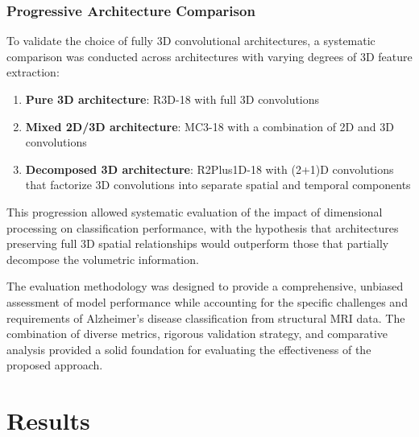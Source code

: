 \documentclass[12pt, a4paper]{article}
\begin{document}
\subsubsection{Progressive Architecture Comparison}

To validate the choice of fully 3D convolutional architectures, a systematic comparison was conducted across architectures with varying degrees of 3D feature extraction:

\begin{enumerate}
    \item \textbf{Pure 3D architecture}: R3D-18 with full 3D convolutions
    
    \item \textbf{Mixed 2D/3D architecture}: MC3-18 with a combination of 2D and 3D convolutions
    
    \item \textbf{Decomposed 3D architecture}: R2Plus1D-18 with (2+1)D convolutions that factorize 3D convolutions into separate spatial and temporal components
\end{enumerate}

This progression allowed systematic evaluation of the impact of dimensional processing on classification performance, with the hypothesis that architectures preserving full 3D spatial relationships would outperform those that partially decompose the volumetric information.

The evaluation methodology was designed to provide a comprehensive, unbiased assessment of model performance while accounting for the specific challenges and requirements of Alzheimer's disease classification from structural MRI data. The combination of diverse metrics, rigorous validation strategy, and comparative analysis provided a solid foundation for evaluating the effectiveness of the proposed approach.

\section{Results}


\end{document}

